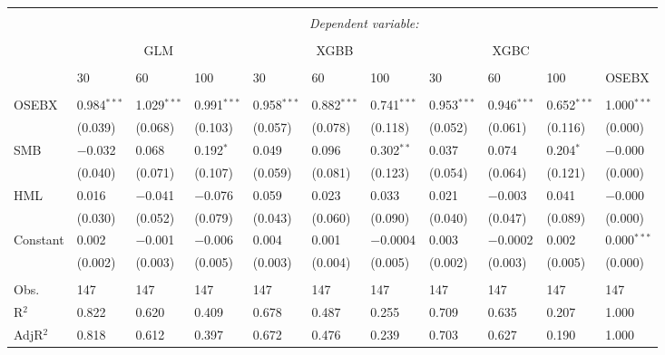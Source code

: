 \begin{appendices}
\begin{table}[H] 
\centering 
\footnotesize
\begin{tabularx}{\textwidth}{XXXXXXXXXXl} 
\\[-2ex]\hline 
\hline \\[-2ex] 
 & \multicolumn{10}{c}{\textit{Dependent variable:}} \\ 
\cline{2-11} 
\\[-2ex] 
 & \multicolumn{3}{c}{GLM} & \multicolumn{3}{c}{XGBB} & \multicolumn{3}{c}{XGBC} & \\
 \cline{2-10}
 \\[-2ex] 
 & 30 & 60 & 100 & 30 & 60 & 100 & 30 & 60 & 100 & OSEBX \\ 
 \cline{2-10} \\

 OSEBX & 0.984$^{***}$ & 1.029$^{***}$ & 0.991$^{***}$ & 0.958$^{***}$ & 0.882$^{***}$ & 0.741$^{***}$ & 0.953$^{***}$ & 0.946$^{***}$ & 0.652$^{***}$ & 1.000$^{***}$ \\ 
  & (0.039) & (0.068) & (0.103) & (0.057) & (0.078) & (0.118) & (0.052) & (0.061) & (0.116) & (0.000) \\ 
 SMB & $-$0.032 & 0.068 & 0.192$^{*}$ & 0.049 & 0.096 & 0.302$^{**}$ & 0.037 & 0.074 & 0.204$^{*}$ & $-$0.000 \\ 
  & (0.040) & (0.071) & (0.107) & (0.059) & (0.081) & (0.123) & (0.054) & (0.064) & (0.121) & (0.000) \\ 
 HML & 0.016 & $-$0.041 & $-$0.076 & 0.059 & 0.023 & 0.033 & 0.021 & $-$0.003 & 0.041 & $-$0.000 \\ 
  & (0.030) & (0.052) & (0.079) & (0.043) & (0.060) & (0.090) & (0.040) & (0.047) & (0.089) & (0.000) \\ 
 Constant & 0.002 & $-$0.001 & $-$0.006 & 0.004 & 0.001 & $-$0.0004 & 0.003 & $-$0.0002 & 0.002 & 0.000$^{***}$ \\ 
  & (0.002) & (0.003) & (0.005) & (0.003) & (0.004) & (0.005) & (0.002) & (0.003) & (0.005) & (0.000) \\ 
\hline \\[-1.8ex] 
Obs. & 147 & 147 & 147 & 147 & 147 & 147 & 147 & 147 & 147 & 147 \\ 
R$^{2}$ & 0.822 & 0.620 & 0.409 & 0.678 & 0.487 & 0.255 & 0.709 & 0.635 & 0.207 & 1.000 \\ 
AdjR$^{2}$ & 0.818 & 0.612 & 0.397 & 0.672 & 0.476 & 0.239 & 0.703 & 0.627 & 0.190 & 1.000 \\ 



\end{tabularx}
\end{table}
\end{appendices}
